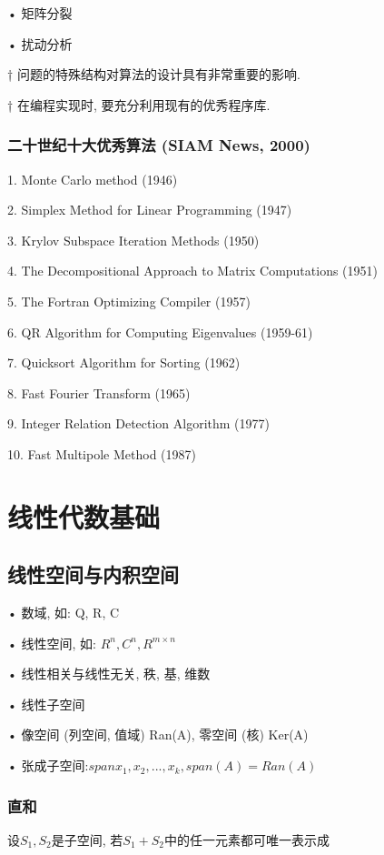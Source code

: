 \documentclass[12pt,a4paper]{article}
\begin{document}
	• 矩阵分裂
	
	• 扰动分析

\begin{framed}
	† 问题的特殊结构对算法的设计具有非常重要的影响.
\end{framed}

\begin{framed}
	† 在编程实现时, 要充分利用现有的优秀程序库.
\end{framed}

\subsubsection*{二十世纪十大优秀算法 (SIAM News, 2000)}
1. Monte Carlo method (1946)

2. Simplex Method for Linear Programming (1947)

3. Krylov Subspace Iteration Methods (1950)

4. The Decompositional Approach to Matrix Computations (1951)

5. The Fortran Optimizing Compiler (1957)

6. QR Algorithm for Computing Eigenvalues (1959-61)

7. Quicksort Algorithm for Sorting (1962)

8. Fast Fourier Transform (1965)

9. Integer Relation Detection Algorithm (1977)

10. Fast Multipole Method (1987)


\section{线性代数基础}
\subsection{线性空间与内积空间}
• 数域, 如: Q, R, C

• 线性空间, 如: $R^n,C^n,R^{m×n}$

• 线性相关与线性无关, 秩, 基, 维数

• 线性子空间

• 像空间 (列空间, 值域) Ran(A), 零空间 (核) Ker(A)

• 张成子空间:$span{x_1, x_2, . . . , x_k}, span(A) = Ran(A)$

\subsubsection{直和}
设$S_1, S_2$是子空间, 若$S_1 + S_2$中的任一元素都可唯一表示成
\end{document}
